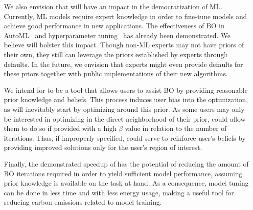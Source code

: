 
We also envision that \method will have an impact in the democratization of ML. Currently, ML models require expert knowledge in order to fine-tune models and achieve good performance in new applications. The effectiveness of BO in AutoML~\cite{feurer_autosklearn, vanschoren2019meta} and hyperparameter tuning~\cite{spearmint, falknerKH18} has already been demonstrated. We believe \method will bolster this impact. Though non-ML experts may not have priors of their own, they still can leverage the priors established by experts through defaults. In the future, we envision that experts might even provide defaults for these priors together with public implementations of their new algorithms. %

We intend for \method to be a tool that allows users to assist BO by providing reasonable prior knowledge and beliefs. This process induces user bias into the optimization, as \method will inevitably start by optimizing around this prior. As some users may only be interested in optimizing in the direct neighborhood of their prior, \method{} could allow them to do so if provided with a high $\beta$ value in relation to the number of iterations. Thus, if improperly specified, \method could serve to reinforce user's beliefs by providing improved solutions only for the user's region of interest. 

Finally, the demonstrated speedup of \method has the potential of reducing the amount of BO iterations required in order to yield sufficient model performance, assuming prior knowledge is available on the task at hand. As a consequence, model tuning can be done in less time and with less energy usage, making \method a useful tool for reducing carbon emissions related to model training.


